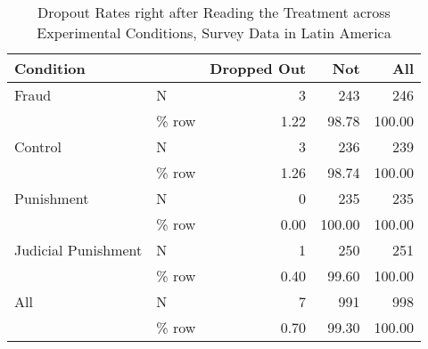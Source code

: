 \begin{table}

\caption{Dropout Rates right after Reading the Treatment across Experimental Conditions,
Survey Data in Latin America}
\centering
\begin{tabular}[t]{llrrr}
\toprule
Condition &   & Dropped Out & Not & All\\
\midrule
Fraud & N & 3 & 243 & 246\\
 & \% row & 1.22 & 98.78 & 100.00\\
Control & N & 3 & 236 & 239\\
 & \% row & 1.26 & 98.74 & 100.00\\
Punishment & N & 0 & 235 & 235\\
 & \% row & 0.00 & 100.00 & 100.00\\
Judicial Punishment & N & 1 & 250 & 251\\
 & \% row & 0.40 & 99.60 & 100.00\\
All & N & 7 & 991 & 998\\
 & \% row & 0.70 & 99.30 & 100.00\\
\bottomrule
\end{tabular}
\end{table}
